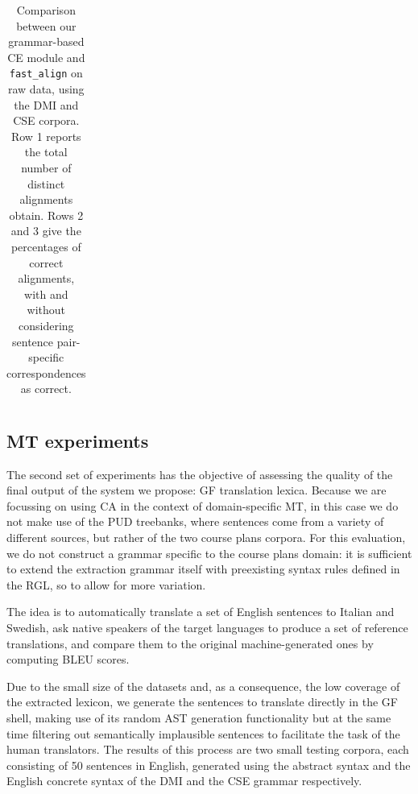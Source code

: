 \documentclass[11pt]{article}
\begin{document}
\begin{table}[h]
  \centering
  \small
  \begin{tabular}{l|lll}

  \end{tabular}
  \caption[Comparison between our grammar-based CE module and \texttt{fast\_align}]{Comparison between our grammar-based CE module and \texttt{fast\_align} on raw data, using the DMI and CSE corpora. Row 1 reports the total number of distinct alignments obtain. Rows 2 and 3 give the percentages of correct alignments, with and without considering sentence pair-specific correspondences as correct.}
  \label{raw_fast}
 \end{table}



\subsection{MT experiments}
The second set of experiments has the objective of assessing the quality of the final output of the system we propose: GF translation lexica. 
Because we are focussing on using CA in the context of domain-specific MT, in this case we do not make use of the PUD treebanks, where sentences come from a variety of different sources, but rather of the two course plans corpora. 
For this evaluation, we do not construct a grammar specific to the course plans domain: it is sufficient to extend the extraction grammar itself with preexisting syntax rules defined in the RGL, so to allow for more variation. %

The idea is to automatically translate a set of English sentences to Italian and Swedish, ask native speakers of the target languages to produce a set of reference translations, and compare them to the original machine-generated ones by computing BLEU scores.

Due to the small size of the datasets and, as a consequence, the low coverage of the extracted lexicon, we generate the sentences to translate directly in the GF shell, making use of its random AST generation functionality but at the same time filtering out semantically implausible sentences to facilitate the task of the human translators.
The results of this process are two small testing corpora, each consisting of 50 sentences in English, generated using the abstract syntax and the English concrete syntax of the DMI and the CSE grammar respectively. 
\end{document}
